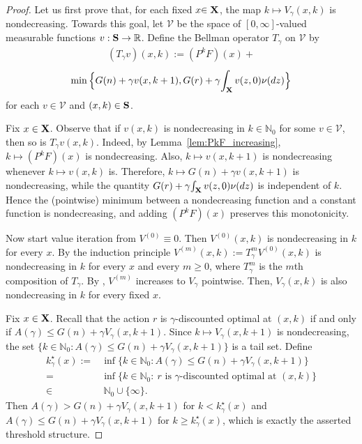 \documentclass[letterpaper,10pt,conference]{ieeeconf}  %
\let\cal\mathcal
\begin{document}
\begin{proof}
Let us first prove that, for each fixed $x{\in {\bf X}}$, the map $k\mapsto {V_\gamma}(x,k)$ is nondecreasing.
Towards this goal, let $\mathcal V$ be the space of {$[0,\infty]$-valued} measurable functions $v: {\bf S}\to\mathbb R$.
 Define {the Bellman operator $T_\gamma$ on ${\cal V}$ by} 
\begin{align}\label{Kostia2026Eqn10}
({T_\gamma} v)(x,k):=(P^kF)(x)+
\end{align}
\[
\min\Big\{G(n)+\gamma v(x,k+1), G(r)+\gamma {\int_{\bf X}v(z,0)\nu(dz)} \Big\}
\]
for each $v\in\mathcal V$ {and $(x,k)\in {\bf S}$}.

Fix $x\in {\bf X}$.  {Observe} that if $v(x,k)$ is nondecreasing in $k\in {\mathbb{N}_0}$ {for some $v\in {\cal V}$}, then so is {$T_\gamma v(x,k)$}.
Indeed, by Lemma~\ref{lem:PkF_increasing}, $k\mapsto (P^kF)(x)$ is nondecreasing.
Also, $k\mapsto v(x,k+1)$ is nondecreasing whenever $k\mapsto v(x,k)$ is.
Therefore, $k\mapsto G(n)+\gamma v(x,k+1)$ is nondecreasing, while the quantity
$G(r)+\gamma{\int_{\bf X}v(z,0)\nu(dz)}$ is independent of $k$.
Hence the {(pointwise)} minimum {between} a nondecreasing function and a constant {function} is nondecreasing, 
and adding $(P^kF)(x)$ preserves {this monotonicity}. 

Now start value iteration from $V^{(0)}\equiv 0$. Then $V^{(0)}(x,k)$ is nondecreasing in $k$ for every $x$.
By the induction principle $V^{(m)}{(x,k)}:={T^m_\gamma} V^{(0)}{(x,k)}$ is nondecreasing in $k$ for every $x$ and every $m\ge0$, {where $T_\gamma^m$ is the $m$th composition of $T_\gamma$}.
{By \cite[Theorem 3.1]{FeinbergORL:2021}}, $V^{(m)}$ increases to {$V_\gamma$ pointwise. Then, $V_\gamma(x,k)$} is also nondecreasing in $k$ for every fixed $x$.

Fix $x\in {\bf X}$. 
{Recall that the action $r$ is $\gamma$-discounted} optimal at $(x,k)$ if and only if
$
{A(\gamma)}\le G(n)+\gamma V_\gamma(x,k+1).
$
{Since $k\mapsto {V_\gamma}(x,k+1)$ is nondecreasing}, the set {$\{k\in\mathbb N_0: A(\gamma)\le G(n)+\gamma V_\gamma(x,k+1)\}$} is a tail set.
Define
\begin{align}\label{eq:kstar_def}
{k^\star_\gamma(x)}:= & \inf\{k\in\mathbb N_0: {A(\gamma)\le G(n)+\gamma V_\gamma(x,k+1)}\}\nonumber\\
= & \inf\{k\in\mathbb N_0:\ \text{$r$ is {$\gamma$-discounted} optimal at } (x,k)\}\nonumber\\ 
\in & \ \mathbb N_0\cup\{\infty\}.
\end{align}
Then {$A(\gamma)> G(n)+\gamma V_\gamma(x,k+1)$} for $k<k^\star_\gamma(x)$ and {$A(\gamma)\le G(n)+\gamma V_\gamma(x,k+1)$} for $k\ge {k^\star_\gamma}(x)$, which is exactly the asserted
threshold structure.


\end{proof}
\end{document}
